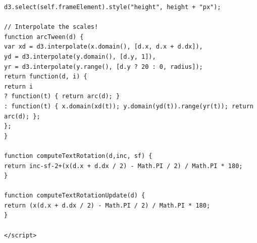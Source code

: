 \documentclass[12pt]{pom_thesis}
\begin{document}
\begin{lstlisting}
d3.select(self.frameElement).style("height", height + "px");

// Interpolate the scales!
function arcTween(d) {
var xd = d3.interpolate(x.domain(), [d.x, d.x + d.dx]),
yd = d3.interpolate(y.domain(), [d.y, 1]),
yr = d3.interpolate(y.range(), [d.y ? 20 : 0, radius]);
return function(d, i) {
return i
? function(t) { return arc(d); }
: function(t) { x.domain(xd(t)); y.domain(yd(t)).range(yr(t)); return arc(d); };
};
}

function computeTextRotation(d,inc, sf) {
return inc-sf-2+(x(d.x + d.dx / 2) - Math.PI / 2) / Math.PI * 180;
}

function computeTextRotationUpdate(d) {
return (x(d.x + d.dx / 2) - Math.PI / 2) / Math.PI * 180;
}

</script>
\end{lstlisting}



\end{document}
